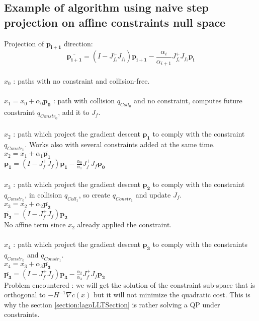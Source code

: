 \documentclass {article}
\newcommand\p{\mathbf{p_i}}
\newcommand\Jfi{J_{f_i}}
\begin{document}
\subsection{Example of algorithm using naive step projection on affine
constraints null space} \label{section:naiveProjectionSection}
Projection of $\mathbf{p_{i+1}}$ direction:
$$\mathbf{\overline{p_{i+1}}} = (I-\Jfi^{+}\Jfi) \mathbf{p_{i+1}} -
\frac{\alpha_i}{\alpha_{i+1}} \Jfi^{+}\Jfi \p$$\\
$x_0$ : paths with no constraint and collision-free. \\
\\
$x_1 = x_0 + \alpha_0 \mathbf{p_0}$ : path with collision $q_{Coll_0}$ and no
constraint, computes future constraint $q_{Constr_0}$, add it to $J_f$.\\
\\
$x_2$ : path which project the gradient descent $\mathbf{p_1}$ to comply with
the constraint $q_{Constr_0}$. Works also with several constraints added at the
same time. \\
$x_2 = x_1 + \alpha_1 \mathbf{\overline{p_1}}$ \\
$\mathbf{\overline{p_1}} = (I-J_f^{+}J_f) \mathbf{p_1} - \frac{\alpha_0}
{\alpha_1}J_f^{+}J_f \mathbf{p_0}$ \\
\\
$x_3$ : path which project the gradient descent $\mathbf{p_2}$ to comply with
the constraint $q_{Constr_0}$, in collision $q_{Coll_1}$, so create $q_{Constr_1}$
and update $J_f$. \\
$x_3 = x_2 + \alpha_2 \mathbf{\overline{p_2}}$ \\
$\mathbf{\overline{p_2}} = (I-J_f^{+}J_f) \mathbf{p_2}$ \\
No affine term since $x_2$ already applied the constraint. \\
\\
$x_4$ : path which project the gradient descent $\mathbf{p_3}$ to comply with
the constraints $q_{Constr_0}$ and $q_{Constr_1}$. \\
$x_4 = x_3 + \alpha_3 \mathbf{\overline{p_3}}$ \\
$\mathbf{\overline{p_3}} = (I-J_f^{+}J_f) \mathbf{p_3} - \frac{\alpha_2}
{\alpha_3} J_f^{+}J_f \mathbf{p_2}$ \\

Problem encountered : we will get the solution of the constraint sub-space
that is orthogonal to $-H^{-1}\nabla c(x)$ but it will not minimize the
quadratic cost. This is why the section \ref{section:lagoLLTSection} is rather solving
a QP under constraints.
\end{document}
